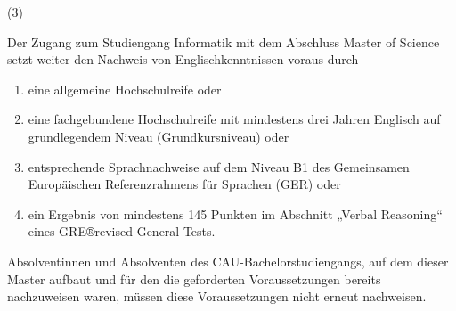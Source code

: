 \documentclass{article}\usepackage{helvet}\renewcommand{\familydefault}{\sfdefault}\usepackage[letterpaper,top=2cm,bottom=2cm,left=3cm,right=3cm,marginparwidth=1.75cm]{geometry}\usepackage[colorlinks=true,allcolors=red]{hyperref}\usepackage{enumitem}\usepackage{tabularx}\usepackage[T1]{fontenc}\setlist[enumerate,1]{label=\arabic*., left=0pt}\setlist[enumerate,2]{label=\alph*., left=0.5em}\setlist[enumerate,3]{label=\alph*\alph*., left=1em}\setlist[enumerate,4]{label=-, left=1.5em}\setlist{nosep}\setlength{\parindent}{0pt}
\begin{document}
	\begin{minipage}[t]
		{2em}
		(3)
	\end{minipage}
\hspace{0.5em}
	\begin{minipage}[t]
		{\dimexpr\linewidth-2em-0.5em\relax}
		Der Zugang zum Studiengang Informatik mit dem Abschluss Master of Science setzt weiter den Nachweis von Englischkenntnissen voraus durch
		\begin{enumerate}
			\item{eine allgemeine Hochschulreife oder}
			\item{eine fachgebundene Hochschulreife mit mindestens drei Jahren Englisch auf grundlegendem Niveau (Grundkursniveau) oder}
			\item{entsprechende Sprachnachweise auf dem Niveau B1 des Gemeinsamen Europäischen Referenzrahmens für Sprachen (GER) oder}
			\item{ein Ergebnis von mindestens 145 Punkten im Abschnitt „Verbal Reasoning“ eines GRE®revised General Tests.}
		\end{enumerate}
Absolventinnen und Absolventen des CAU-Bachelorstudiengangs, auf dem dieser Master aufbaut und für den die geforderten Voraussetzungen bereits nachzuweisen waren, müssen diese Voraussetzungen nicht erneut nachweisen.
	\end{minipage}

\medski
\end{document}
